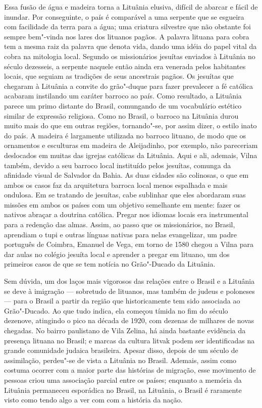 {Essa fusão de água e madeira torna a Lituânia elusiva, difícil de
abarcar e fácil de inundar. Por conseguinte, o país é comparável a uma
serpente que se esgueira com facilidade da terra para a água; uma
criatura silvestre que não obstante foi sempre bem"-vinda nos lares dos
lituanos pagãos. A palavra lituana para cobra tem a mesma raiz da
palavra que denota vida, dando uma idéia do papel vital da cobra na
mitologia local. Segundo os missionários jesuítas enviados à Lituânia no
século dezesseis, a serpente naquele então ainda era venerada pelos
habitantes locais, que seguiam as tradições de seus ancestrais pagãos.
Os jesuítas que chegaram à Lituânia a convite do grão"-duque para fazer
prevalecer a fé católica acabaram instilando um caráter barroco ao país.
Como resultado, a Lituânia parece um primo distante do Brasil,
comungando de um vocabulário estético similar de expressão religiosa.
Como no Brasil, o barroco na Lituânia durou muito mais do que em outras
regiões, tornando"-se, por assim dizer, o estilo inato do país. A madeira
é largamente utilizada no barroco lituano, de modo que os ornamentos e
esculturas em madeira de Aleijadinho, por exemplo, não pareceriam
deslocados em muitas das igrejas católicas da Lituânia. Aqui e ali,
ademais, Vilna também, devido a seu barroco local instituído pelos
jesuítas, comunga da afinidade visual de Salvador da Bahia. As duas
cidades são colinosas, o que em ambos os casos faz da arquitetura
barroca local menos espalhada e mais ondulosa. Em se tratando de
jesuítas, cabe sublinhar que eles abordaram suas missões em ambos os
países com um objetivo semelhante em mente: fazer os nativos abraçar a
doutrina católica. Pregar nos idiomas locais era instrumental para a
redenção das almas. Assim, ao passo que os missionários, no Brasil,
aprendiam o tupi e outras línguas nativas para nelas evangelizar, um
padre português de Coimbra, Emanuel de Vega, em torno de 1580 chegou a
Vilna para dar aulas no colégio jesuíta local e aprender a pregar em
lituano, um dos primeiros casos de que se tem notícia no Grão"-Ducado da
Lituânia.

Sem dúvida, um dos laços mais vigorosos das relações entre o Brasil e a
Lituânia se deve à imigração --- sobretudo de lituanos, mas também de
judeus e poloneses --- para o Brasil a partir da região que historicamente
tem sido associada ao Grão"-Ducado. Ao que tudo indica, ela começou
tímida no fim do século dezenove, atingindo o pico na década de 1920,
com dezenas de milhares de novas chegadas. No bairro paulistano de Vila
Zelina, há ainda bastante evidência da presença lituana no Brasil; e
marcas da cultura litvak podem ser identificadas na grande comunidade
judaica brasileira. Apesar disso, depois de um século de assimilação,
perdeu"-se de vista a Lituânia no Brasil. Ademais, assim como costuma
ocorrer com a maior parte das histórias de migração, esse movimento de
pessoas criou uma associação parcial entre os países; enquanto a memória
da Lituânia permaneceu esporádica no Brasil, na Lituânia, o Brasil é
raramente visto como tendo algo a ver com com a história da nação.

}
